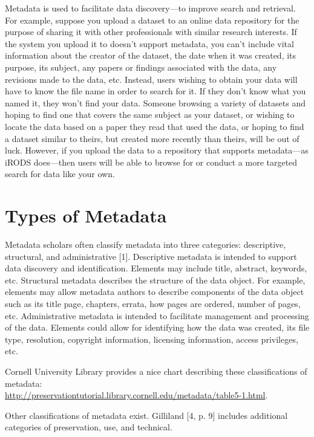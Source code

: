 \documentclass[10pt,oneside]{memoir}
\begin{document}
Metadata is used to facilitate data discovery---to improve search and retrieval. For example, suppose you upload a dataset to an online data repository for the purpose of sharing it with other professionals with similar research interests. If the system you upload it to doesn't support metadata, you can't include vital information about the creator of the dataset, the date when it was created, its purpose, its subject, any papers or findings associated with the data, any revisions made to the data, etc. Instead, users wishing to obtain your data will have to know the file name in order to search for it. If they don't know what you named it, they won't find your data. Someone browsing a variety of datasets and hoping to find one that covers the same subject as your dataset, or wishing to locate the data based on a paper they read that used the data, or hoping to find a dataset similar to theirs, but created more recently than theirs, will be out of luck. However, if you upload the data to a repository that supports metadata---as iRODS does---then users will be able to browse for or conduct a more targeted search for data like your own.

\section{Types of Metadata}

Metadata scholars often classify metadata into three categories: descriptive, structural, and administrative [1].
Descriptive metadata is intended to support data discovery and identification. Elements may include title, abstract, keywords, etc.
Structural metadata describes the structure of the data object. For example, elements may allow metadata authors to describe components of the data object such as its title page, chapters, errata, how pages are ordered, number of pages, etc.
Administrative metadata is intended to facilitate management and processing of the data.
Elements could allow for identifying how the data was created, its file type, resolution, copyright information, licensing information, access privileges, etc.

Cornell University Library provides a nice chart describing these classifications of metadata: \\ \url{http://preservationtutorial.library.cornell.edu/metadata/table5-1.html}.

Other classifications of metadata exist. Gilliland [4, p. 9] includes additional categories of preservation, use, and technical.
\end{document}
